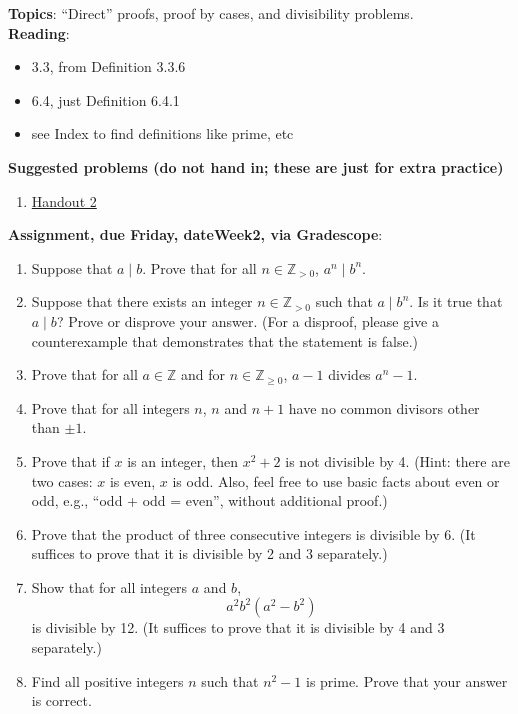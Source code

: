 \documentclass[12pt]{article}
\begin{document}
\textbf{Topics}: ``Direct'' proofs, proof by cases, and divisibility problems. 
\\



\noindent \textbf{Reading}:
\begin{itemize}
\item 3.3, from Definition 3.3.6
\item 6.4, just Definition 6.4.1  
\item see Index to find definitions like prime, etc
\end{itemize}



\noindent \textbf{Suggested problems (do not hand in; these are just for extra practice)}

\begin{enumerate}


\item \href{https://www.math.emory.edu/~dzb/teaching/250Fall2021/handouts/250-H02-divisibility.pdf}{Handout 2}
\end{enumerate}


\noindent \textbf{Assignment, due Friday, \csname dateWeek2\endcsname, via Gradescope}:

\begin{enumerate}
\item Suppose that $a \mid b$. Prove that for all $n \in \mathbb{Z}_{> 0}$, $a^n \mid b^n$.
\item Suppose that there exists an integer $n \in \mathbb{Z}_{> 0}$ such that $a \mid b^n$. Is it true that $a \mid b$? Prove or disprove your answer. (For a disproof, please give a counterexample that demonstrates that the statement is false.)
  
\item Prove that for all $a \in \mathbb{Z}$ and for $n \in \mathbb{Z}_{\geq 0}$, $a-1$ divides $a^n -1$.

\item Prove that for all integers $n$, $n$ and $n+1$ have no common divisors other than $\pm 1$.

\item Prove that if $x$ is an integer, then $x^2 + 2$ is not divisible by 4. (Hint: there are two cases: $x$ is even, $x$ is odd. Also, feel free to use basic facts about even or odd, e.g., ``odd + odd = even'', without additional proof.)
\item Prove that the product of three consecutive integers is divisible by 6. (It suffices to prove that it is divisible by 2 and 3 separately.)
\item Show that for all integers $a$ and $b$, 
\[
a^2b^2(a^2 - b^2)
\]
is divisible by 12. (It suffices to prove that it is divisible by 4 and 3 separately.)
\item Find all positive integers $n$ such that $n^2 - 1$ is prime. Prove that your answer is correct.

\end{enumerate}
\end{document}
